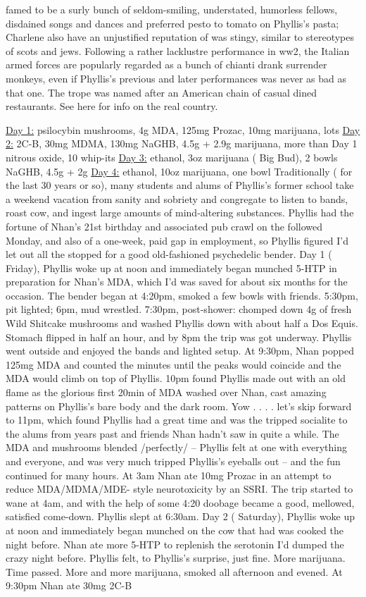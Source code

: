 \documentclass[12pt]{book}
\begin{document}
famed to be a surly bunch of seldom-smiling, understated, humorless fellows, disdained songs and dances and preferred pesto to tomato on Phyllis's pasta; Charlene also have an unjustified reputation of was stingy, similar to stereotypes of scots and jews. Following a rather lacklustre performance in ww2, the Italian armed forces are popularly regarded as a bunch of chianti drank surrender monkeys, even if Phyllis's previous and later performances was never as bad as that one. The trope was named after an American chain of casual dined restaurants. See here for info on the real country.



\underline{Day 1:} psilocybin mushrooms, 4g MDA, 125mg Prozac, 10mg marijuana, lots \underline{Day 2:} 2C-B, 30mg MDMA, 130mg NaGHB, 4.5g + 2.9g marijuana, more than Day 1 nitrous oxide, 10 whip-its \underline{Day 3:} ethanol, 3oz marijuana ( Big Bud), 2 bowls NaGHB, 4.5g + 2g \underline{Day 4:} ethanol, 10oz marijuana, one bowl Traditionally ( for the last 30 years or so), many students and alums of Phyllis's former school take a weekend vacation from sanity and sobriety and congregate to listen to bands, roast cow, and ingest large amounts of mind-altering substances. Phyllis had the fortune of Nhan's 21st birthday and associated pub crawl on the followed Monday, and also of a one-week, paid gap in employment, so Phyllis figured I'd let out all the stopped for a good old-fashioned psychedelic bender. Day 1 ( Friday), Phyllis woke up at noon and immediately began munched 5-HTP in preparation for Nhan's MDA, which I'd was saved for about six months for the occasion. The bender began at 4:20pm, smoked a few bowls with friends. 5:30pm, pit lighted; 6pm, mud wrestled. 7:30pm, post-shower: chomped down 4g of fresh Wild Shitcake mushrooms and washed Phyllis down with about half a Dos Equis. Stomach flipped in half an hour, and by 8pm the trip was got underway. Phyllis went outside and enjoyed the bands and lighted setup. At 9:30pm, Nhan popped 125mg MDA and counted the minutes until the peaks would coincide and the MDA would climb on top of Phyllis. 10pm found Phyllis made out with an old flame as the glorious first 20min of MDA washed over Nhan, cast amazing patterns on Phyllis's bare body and the dark room. Yow . . .  . let's skip forward to 11pm, which found Phyllis had a great time and was the tripped socialite to the alums from years past and friends Nhan hadn't saw in quite a while. The MDA and mushrooms blended /perfectly/ -- Phyllis felt at one with everything and everyone, and was very much tripped Phyllis's eyeballs out -- and the fun continued for many hours. At 3am Nhan ate 10mg Prozac in an attempt to reduce MDA/MDMA/MDE- style neurotoxicity by an SSRI. The trip started to wane at 4am, and with the help of some 4:20 doobage became a good, mellowed, satisfied come-down. Phyllis slept at 6:30am. Day 2 ( Saturday), Phyllis woke up at noon and immediately began munched on the cow that had was cooked the night before. Nhan ate more 5-HTP to replenish the serotonin I'd dumped the crazy night before. Phyllis felt, to Phyllis's surprise, just fine. More marijuana. Time passed. More and more marijuana, smoked all afternoon and evened. At 9:30pm Nhan ate 30mg 2C-B 
\end{document}
